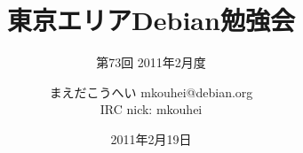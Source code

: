 




\documentclass[cjk,dvipdfmx,12pt]{beamer}
\usepackage{monthlypresentation}



\title{東京エリアDebian勉強会}
\subtitle{第73回 2011年2月度}
\author{まえだこうへい mkouhei@debian.org\\IRC nick: mkouhei}
\date{2011年2月19日}



